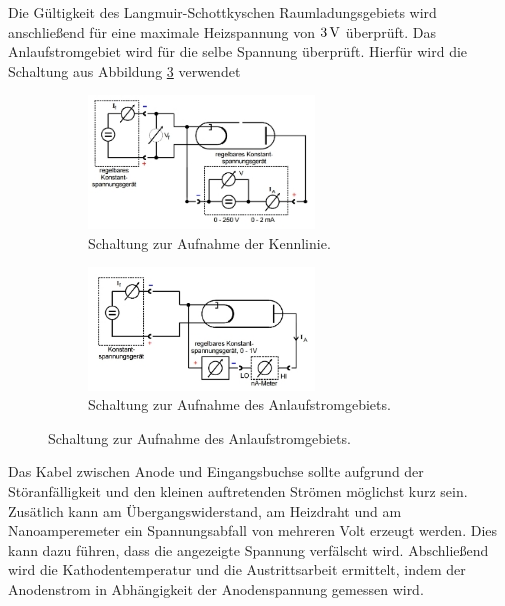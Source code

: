 Die Gültigkeit des Langmuir-Schottkyschen Raumladungsgebiets wird anschließend
für eine maximale Heizspannung von $3\,\si{\volt}$ überprüft. Das Anlaufstromgebiet wird
für die selbe Spannung überprüft. Hierfür wird die Schaltung aus Abbildung \ref{schaltB}
verwendet
\begin{figure}
  \centering
  \begin{subfigure}{0.45\textwidth}
    \centering
    \includegraphics[width=6cm]{bilder/schaltA.jpg}
    \caption{Schaltung zur Aufnahme der Kennlinie. \cite{504}}
    \label{schaltA}
  \end{subfigure}
  \begin{subfigure}{0.45\textwidth}
    \centering
    \includegraphics[width=6cm]{bilder/schaltB.jpg}
    \caption{Schaltung zur Aufnahme des Anlaufstromgebiets. \cite{504}}
    \label{schaltB}
  \end{subfigure}
\end{figure}
Das Kabel zwischen Anode und Eingangsbuchse sollte aufgrund der Störanfälligkeit
und den kleinen auftretenden Strömen möglichst kurz sein. Zusätlich kann am
Übergangswiderstand, am Heizdraht und am Nanoamperemeter ein Spannungsabfall
von mehreren Volt erzeugt werden. Dies kann dazu führen, dass die angezeigte Spannung verfälscht
wird.
Abschließend wird die Kathodentemperatur und die Austrittsarbeit ermittelt,
indem der Anodenstrom in Abhängigkeit der Anodenspannung gemessen wird.
